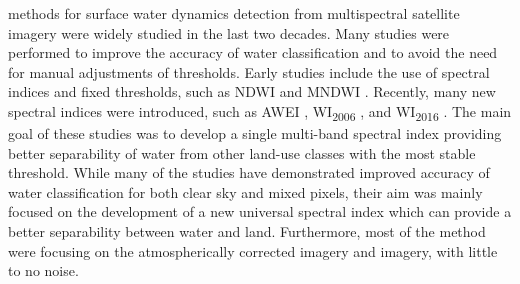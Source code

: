  methods for surface water dynamics detection from multispectral satellite imagery were widely studied in the last two decades. Many studies were performed to improve the accuracy of water classification and to avoid the need for manual adjustments of thresholds. Early studies include the use of spectral indices and fixed thresholds, such as NDWI \citep{McFeeters1996} and MNDWI \citep{Xu2006}. Recently, many new spectral indices were introduced, such as AWEI \citep{feyisa2014automated}, WI\textsubscript{2006} \citep{homer2004development}, and WI\textsubscript{2016} \citep{fisher2016comparing}. The main goal of these studies was to develop a single multi-band spectral index providing better separability of water from other land-use classes with the most stable threshold.  While many of the studies have demonstrated improved accuracy of water classification for both clear sky and mixed pixels, their aim was mainly focused on the development of a new universal spectral index which can provide a better separability between water and land. Furthermore, most of the method were focusing on the atmospherically corrected imagery and imagery, with little to no noise. 

